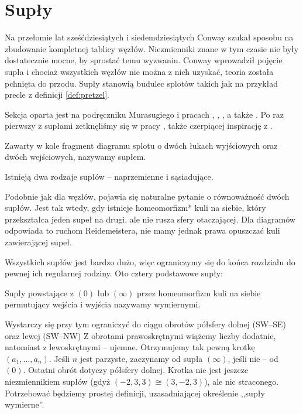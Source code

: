 \section{Supły} %
\label{sec:tangle}

Na przełomie lat sześćdziesiątych i siedemdziesiątych Conway szukał sposobu na zbudowanie kompletnej tablicy węzłów.
Niezmienniki znane w tym czasie nie były dostatecznie mocne, by sprostać temu wyzwaniu.
Conway wprowadził pojęcie supła i chociaż wszystkich węzłów nie można z nich uzyskać, teoria została pchnięta do przodu.
Supły stanowią budulec splotów takich jak na przykład precle z definicji \ref{def:pretzel}.

Sekcja oparta jest na podręczniku Murasugiego \cite{murasugi96} i pracach \cite{conway70}, \cite{kauffman97}, \cite{kauffman04}, a także \cite{schubert56}.
Po raz pierwszy z supłami zetknęliśmy się w pracy \cite{janiak04}, także czerpiącej inspirację z \cite{murasugi96}.

\begin{definition}[supeł]
	\label{def:tangle}
	Zawarty w kole fragment diagramu splotu o dwóch łukach wyjściowych oraz dwóch wejściowych, nazywamy supłem.
\end{definition}

Istnieją dwa rodzaje supłów -- naprzemienne i sąsiadujące.


Podobnie jak dla węzłów, pojawia się naturalne pytanie o równoważność dwóch supłów.
Jest tak wtedy, gdy istnieje homeomorfizm* kuli na siebie, który przekształca jeden supeł na drugi, ale nie rusza sfery otaczającej.
Dla diagramów odpowiada to ruchom Reidemeistera, nie mamy jednak prawa opuszczać kuli zawierającej supeł.

Wszystkich supłów jest bardzo dużo, więc ograniczymy się do końca rozdziału do pewnej ich regularnej rodziny.
Oto cztery podstawowe supły:


\begin{definition}
	\label{def:rational_tangle}
	Supły powstające z $(0)$ lub $(\infty)$ przez homeomorfizm kuli na siebie permutujący wejścia i wyjścia nazywamy wymiernymi.
\end{definition}

Wystarczy się przy tym ograniczyć do ciągu obrotów półsfery dolnej (SW--SE) oraz lewej (SW--NW)
Z obrotami prawoskrętnymi wiążemy liczby dodatnie, natomiast z lewoskrętnymi -- ujemne.
Otrzymujemy tak pewną krotkę $(a_1, \ldots, a_n)$.
Jeśli $n$ jest parzyste, zaczynamy od supła $(\infty)$, jeśli nie -- od $(0)$.
Ostatni obrót dotyczy półsfery dolnej.
Krotka nie jest jeszcze niezmiennikiem supłów (gdyż $(-2,3,3) \cong (3, -2, 3)$), ale nic straconego.
Potrzebować będziemy prostej definicji, uzasadniającej określenie ,,supły wymierne''.

